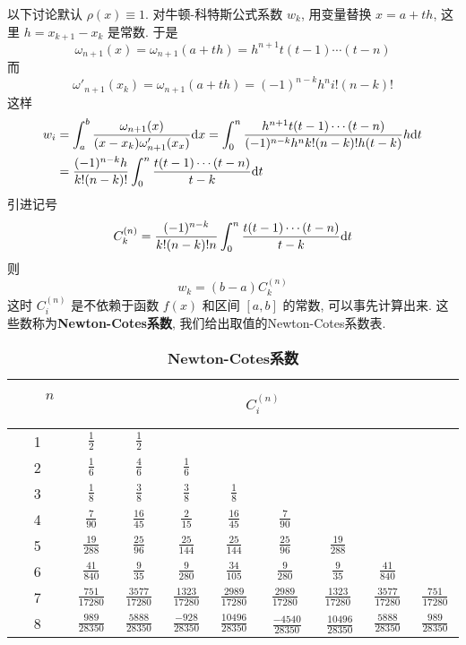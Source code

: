 \documentclass[a4paper]{ctexart}
\begin{document}
以下讨论默认 $\rho(x) \equiv 1$. 对牛顿-科特斯公式系数 $w_k$, 用变量替换 $x = a + th$, 
这里 $h = x_{k + 1} - x_k$ 是常数. 于是
$$
\omega_{n+1}(x)=\omega_{n+1}(a+th)=h^{n+1}t(t-1)\cdots(t-n)
$$
而
$$
\omega'_{n+1}(x_k)=\omega_{n+1}(a+th)=(-1)^{n-k}h^ni!(n-k)!
$$
这样
\begin{align}
  w_i&=\int^b_a\frac{\omega_{n+1}(x)}{(x-x_k)\omega'_{n+1}(x_x)}
  {\rm d}x=\int^n_0\frac{h^{n+1}t(t-1)\cdots(t-n)}{(-1)^{n-k}h^nk!
  (n-k)!h(t-k)}h{\rm d}t\\
  &=\frac{(-1)^{n-k}h}{k!(n-k)!}\int^n_0\frac{t(t-1)\cdots(t-n)}
  {t-k}{\rm d}t  
\end{align}
引进记号 
\begin{equation}
C_k^{(n)}=\frac{(-1)^{n-k}}{k!(n-k)!n}\int^n_0\frac{t(t-1)\cdots(t-n)
}{t-k}{\rm d}t 
\end{equation}
则 
\begin{equation} 
w_k=(b-a)C_k^{(n)}
\end{equation}
这时 $C_i^{(n)}$ 是不依赖于函数 $f(x)$ 和区间 $[a,b]$ 的常数, 可以事先计算出来.
这些数称为{\bf Newton-Cotes系数}, 我们给出取值的Newton-Cotes系数表.

\begin{table}[h]
\caption{\bf Newton-Cotes系数}
\begin{center}
 \begin{tabular}{|c|c|c|c|c|c|c|c|c|}\hline
 \ \ \   $n$\ \ \   & \multicolumn{8}{|c|}{   $C_i^{(n)}$   }\\
   \hline
  1  &  $\frac{1 }{2} $ & $ \frac{1 }{2}$  &   &    &   &   &   &    \\\hline
  2  &  $\frac{1 }{6} $ & $ \frac{4 }{6}$  & $\frac{1 }{6} $  &    &   &   &   &    \\\hline
  3  &  $\frac{1 }{8} $ & $ \frac{3 }{8}$  & $\frac{3 }{8} $ &$\frac{1 }{8}$    &   &   &   &    \\\hline
  4  &  $\frac{7 }{90}$  & $ \frac{16 }{45}$  & $\frac{2 }{15}$  & $\frac{16 }{45} $   &$ \frac{7 }{90}$  &   &   &    \\\hline
  5  &  $\frac{19 }{288}$  &  $\frac{25 }{96}$  &  $\frac{25 }{144}$ & $\frac{25}{144}$   &$\frac{25 }{96}$   &  $\frac{19 }{288}$   &   &    \\\hline
  6  &  $\frac{41 }{840}$  &  $\frac{9 }{35}$  &  $\frac{9 }{280}$ & $\frac{34}{105}$   &$\frac{9 }{280}$   & $\frac{9 }{35}$   & $\frac{41 }{840}$   &    \\\hline
  7  &  $\frac{751 }{17280}$  &  $\frac{3577 }{17280}$  &  $\frac{1323 }{17280}$ & $\frac{2989 }{17280}$    &$\frac{2989 }{17280}$   &  $\frac{1323 }{17280}$   &   $\frac{3577 }{17280}$  &  $\frac{751}{17280}$    \\\hline
  8  &  $\ \frac{989 }{28350}\ $  &  $\ \frac{5888 }{28350}\ $  & $\ \frac{-928 }{28350}\ $ &$\ \frac{10496 }{28350}\ $   &\ $\frac{-4540 }{28350}\ $  &\ $\frac{10496 }{28350}\ $   & $\ \frac{5888}{28350}\ $  &  $\ \frac{989 }{28350}\ $  \\\hline
 \end{tabular}
\end{center}
\end{table}
\end{document}
